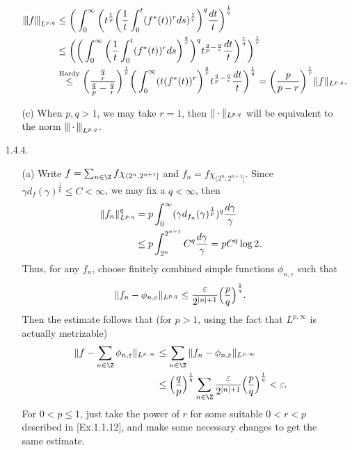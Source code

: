 \begin{enumerate}
\begin{enumerate}
   \begin{equation*}\begin{aligned}
   \norml{f}_{L^{p,q}} &\leq \bigg(\int_{0}^{\infty}\bigg(t^{\frac{1}{p}}\bigg(\frac{1}{t}\int_{0}^{t}(f^{*}(t))^{r}ds)^{\frac{1}{r}}\bigg)^{q}\frac{dt}{t}\bigg)^{\frac{1}{q}}\\
   &\leq \bigg(\bigg(\int_{0}^{\infty}\bigg(\frac{1}{t}\int_{0}^{t}(f^{*}(t))^{r}ds\bigg)^{\frac{q}{r}}\bigg)^{q}t^{\frac{q}{p}-\frac{q}{r}}\frac{dt}{t}\bigg)^{\frac{r}{q}}\bigg)^{\frac{1}{r}}\\
   &\overset{\text{Hardy}}{\leq} \bigg(\frac{\frac{q}{r}}{\frac{q}{p}-\frac{q}{r}}\bigg)^{\frac{1}{r}}\bigg(\int_{0}^{\infty}(t(f^{*}(t))^{r}\bigg)^{\frac{q}{r}}t^{\frac{q}{p}-\frac{q}{r}}\frac{dt}{t}\bigg)^{\frac{1}{q}}
   = \bigg(\frac{p}{p-r}\bigg)^{\frac{1}{r}}\norm{f}_{L^{p,q}}.
   \end{aligned}\end{equation*}

   \item[(c)] When $p,q>1$, we may take $r=1$, then $\norm{\cdot}_{L^{p,q}}$ 
   will be equivalent to the norm $\norml{\,\cdot\,}_{L^{p,q}}$.
   \end{enumerate}

\item[1.4.4.]
   \begin{enumerate}
   \item[(a)] Write $f = \sum_{n \in \Z} f\chi_{(2^{n},2^{n+1}]}$ and $f_{n}=f\chi_{(2^{n},2^{n+1}]}$. 
   Since $\gamma d_{f}(\gamma)^{\frac{1}{p}} \leq C < \infty$, 
   we may fix a $q < \infty$, then
   \begin{equation*}\begin{aligned}
   \Vert f_{n} \Vert_{L^{p,q}}^{q} &= p\int_{0}^{\infty}(\gamma d_{f_{n}}(\gamma)^{\frac{1}{p}})^{q}\frac{d\gamma}{\gamma} \\
   &\leq p\int_{2^{n}}^{2^{n+1}}C^{q}\frac{d\gamma}{\gamma} = pC^{q}\log 2.
   \end{aligned}\end{equation*}
   Thus, for any $f_{n}$, choose finitely combined simple functions $\phi_{n,\varepsilon}$ such that
   \[\Vert f_{n}-\phi_{n,\varepsilon} \Vert_{L^{p,q}} \leq \frac{\varepsilon}{2^{|n|+1}}\Big(\frac{p}{q}\Big)^{\frac{1}{q}}.\]
   Then the estimate follows that (for $p>1$, using the fact that $L^{p,\infty}$ is actually metrizable)
   \begin{equation*}\begin{aligned}
   \norm{f-\sum_{n \in \Z}\phi_{n,\varepsilon}}_{L^{p,\infty}} &\leq \sum_{n \in \Z}\norm{f_n-\phi_{n,\varepsilon}}_{L^{p,\infty}}\\ 
   &\leq \Big(\frac{q}{p}\Big)^{\frac{1}{q}}\sum_{n \in \Z}\frac{\varepsilon}{2^{|n|+1}}\Big(\frac{p}{q}\Big)^{\frac{1}{q}} <\varepsilon.
   \end{aligned}\end{equation*}
   For $0< p \leq 1$, just take the power of $r$ for some suitable $0 < r <p$ 
   described in [Ex.1.1.12], and make some necessary changes to get the same estimate.


\end{enumerate}
\end{enumerate}
